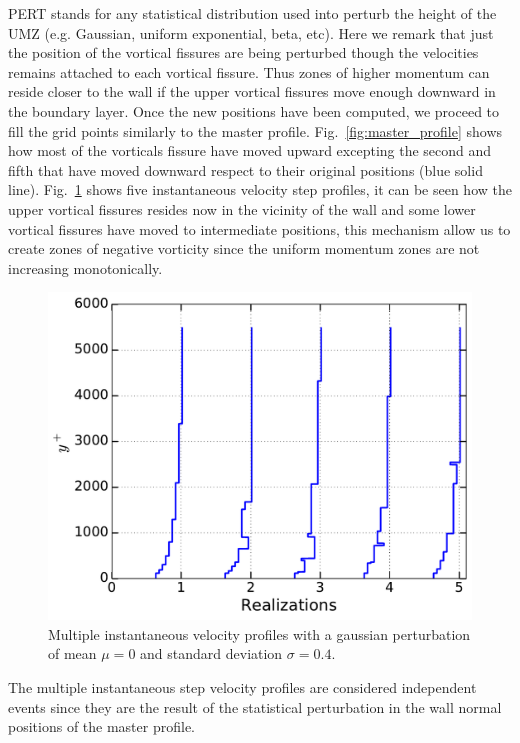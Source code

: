 \documentclass[aps,reprint,amsmath,amssymb,pra]{revtex4-1}%
\begin{document}
PERT stands for any statistical distribution used into perturb the height of the UMZ (e.g. Gaussian, uniform exponential, beta, etc). 
Here we remark that just the position of the vortical fissures are being perturbed though the velocities remains attached to each vortical fissure. Thus zones of higher momentum can reside closer to the wall if the upper vortical fissures move enough downward in the boundary layer. Once the new positions have been computed, we proceed to fill the grid points similarly to the master profile. Fig.~\ref{fig:master_profile} shows how most of the vorticals fissure have moved upward excepting the second and fifth that have moved downward respect to their original positions (blue solid line).  Fig.~\ref{fig:mul_profiles} shows five instantaneous velocity step profiles,  it can be seen how the upper vortical fissures resides now in the vicinity of the wall and some lower vortical fissures have moved to intermediate positions, this mechanism allow us to create zones of negative vorticity since the  uniform momentum zones are not increasing monotonically. 

\begin{figure}[tbh]
\includegraphics[scale=0.45]{figures/multiple_instantaneous_vprof}
\caption{\label{fig:mul_profiles} Multiple instantaneous velocity profiles with a gaussian perturbation of mean $\mu=0$ and standard deviation $\sigma=0.4$.}
\end{figure}

The multiple instantaneous step velocity profiles are considered independent events since they are the result of the statistical perturbation in the wall normal positions of the master profile.
\end{document}
